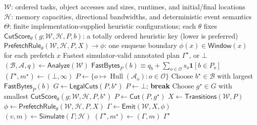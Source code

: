 \documentclass[10pt]{article}
\begin{document}
\setcounter{algorithm}{1}
\begin{algorithm}[H]
\caption{PressureFit planning}
\label{alg:pressurefit}
\small
\begin{algorithmic}[1]
\Require $\mathcal W$: ordered tasks, object accesses and sizes, runtimes,
  and initial/final locations
\Statex \hspace{\algorithmicindent}$\mathcal H$: memory capacities,
  directional bandwidths, and deterministic event semantics
\Statex \hspace{\algorithmicindent}$\Theta$: finite implementation-supplied
  heuristic configurations; each $\theta$ fixes
\Statex \hspace{\algorithmicindent}$\mathsf{CutScore}_\theta(g;\mathcal W,\mathcal H,P,b)$:
  a totally ordered heuristic key (lower is preferred)
\Statex \hspace{\algorithmicindent}$\mathsf{PrefetchRule}_\theta(\mathcal W,\mathcal H,P,X)\to\phi$:
  one enqueue boundary $\phi(x)\in\mathsf{Window}(x)$ for each prefetch $x$
\Ensure Fastest simulator-valid annotated plan $\Gamma^\star$, or $\bot$
\State $(\mathcal B,\mathcal A,q)\gets\mathsf{Analyze}(\mathcal W)$
\State $\mathsf{FastBytes}_P(b)\equiv
  q_b+\sum_{o\in\mathcal O}s_o\mathbf 1[b\in P_o]$
\State $(\Gamma^\star,m^\star)\gets(\bot,\infty)$
\ForAll{$\theta\in\Theta$}
  \State $P\gets\{o\mapsto\operatorname{Hull}(\mathcal A_o):o\in\mathcal O\}$
  \State Choose $b^\star\in\mathcal B$ with largest $\mathsf{FastBytes}_P(b)$
  \State $G \gets \mathsf{LegalCuts}(P,b^\star)$
    \State $P\gets\bot$; \textbf{break}
  \EndIf
  \State Choose $g^\star\in G$ with smallest
    $\mathsf{CutScore}_\theta(g;\mathcal W,\mathcal H,P,b^\star)$
  \State $P \gets \mathsf{Cut}(P,g^\star)$
  \EndWhile
    \State $X\gets\mathsf{Transitions}(\mathcal W,P)$
    \State $\phi\gets\mathsf{PrefetchRule}_\theta(\mathcal W,\mathcal H,P,X)$
    \State $\Gamma\gets\mathsf{Emit}(\mathcal W,X,\phi)$
    \State $(v,m)\gets\mathsf{Simulate}(\Gamma;\mathcal H)$
      \State $(\Gamma^\star,m^\star)\gets(\Gamma,m)$
    \EndIf
  \EndIf
\EndFor
\State \Return $\Gamma^\star$
\end{algorithmic}
\end{algorithm}
\end{document}
